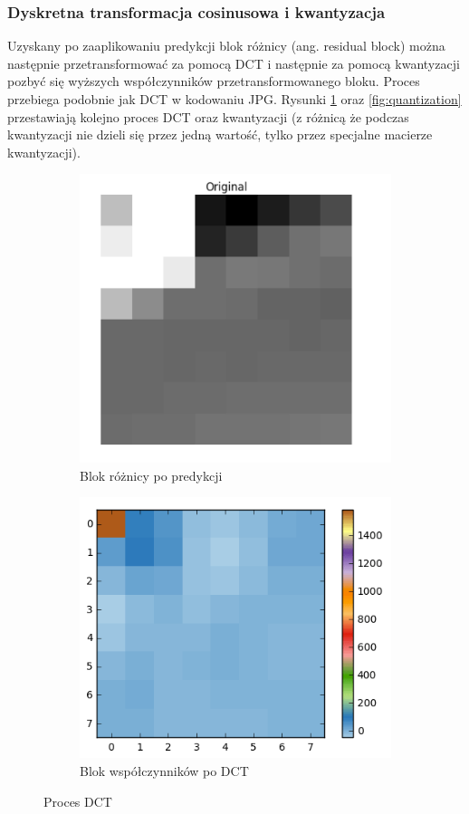 \subsubsection{Dyskretna transformacja cosinusowa i kwantyzacja}

Uzyskany po zaaplikowaniu predykcji blok różnicy (ang. residual block) można następnie
przetransformować za pomocą DCT i następnie za pomocą kwantyzacji pozbyć się wyższych współczynników
przetransformowanego bloku. Proces przebiega podobnie jak DCT w kodowaniu JPG. Rysunki
\ref{fig:dct} oraz \ref{fig:quantization} przestawiają kolejno proces DCT oraz kwantyzacji (z
różnicą że podczas kwantyzacji nie dzieli się przez jedną wartość, tylko przez specjalne macierze kwantyzacji).

\begin{figure}[H]
    \centering
    \begin{subfigure}{0.48\linewidth}
        \centering
        \includegraphics[width=.7\linewidth]{img/rozdzial2/dct_original}
        \caption{Blok różnicy po predykcji}
    \end{subfigure}
    \begin{subfigure}{0.48\linewidth}
        \centering
        \includegraphics[width=.7\linewidth]{img/rozdzial2/dct_coefficients}
        \caption{Blok współczynników po DCT}
    \end{subfigure}
    \caption{Proces DCT}
    \label{fig:dct}
\end{figure}

